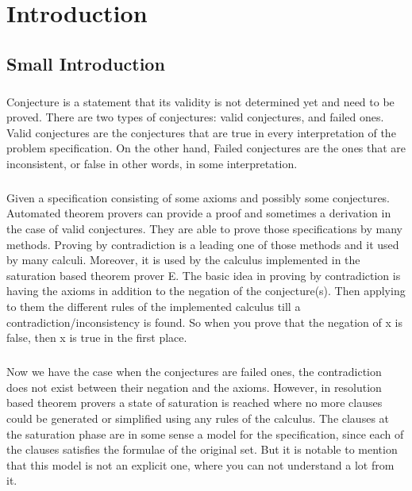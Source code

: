 \chapter{Introduction}\label{chap:intro}

	
	\section{Small Introduction}	
	
	\paragraph{}
	Conjecture is a statement that its validity is not determined yet and need to be proved. There are two types of conjectures: valid conjectures, and failed ones. Valid conjectures are the conjectures that are true in every interpretation of the problem specification. On the other hand, Failed conjectures are the ones that are inconsistent, or false in other words, in some interpretation.
	
	
	\paragraph{}
	Given a specification consisting of some axioms and possibly some conjectures. Automated theorem provers can provide a proof and sometimes a derivation in the case of valid conjectures. They are able to prove those specifications by many methods. Proving by contradiction is a leading one of those methods and it used by many calculi. Moreover, it is used by the calculus implemented in the saturation based theorem prover E. The basic idea in proving by contradiction is having the axioms in addition to the negation of the conjecture(s). Then applying to them the different rules of the implemented calculus till a contradiction/inconsistency is found. So when you prove that the negation of x is false, then x is true in the first place.
	
	
	\paragraph{}
	Now we have the case when the conjectures are failed ones, the contradiction does not exist between their negation and the axioms. However, in resolution based theorem provers a state of saturation is reached where no more clauses could be generated or simplified using any rules of the calculus. The clauses at the saturation phase are in some sense a model for the specification, since each of the clauses satisfies the formulae of the original set. But it is notable to mention that this model is not an explicit one, where you can not understand a lot from it.  
	
